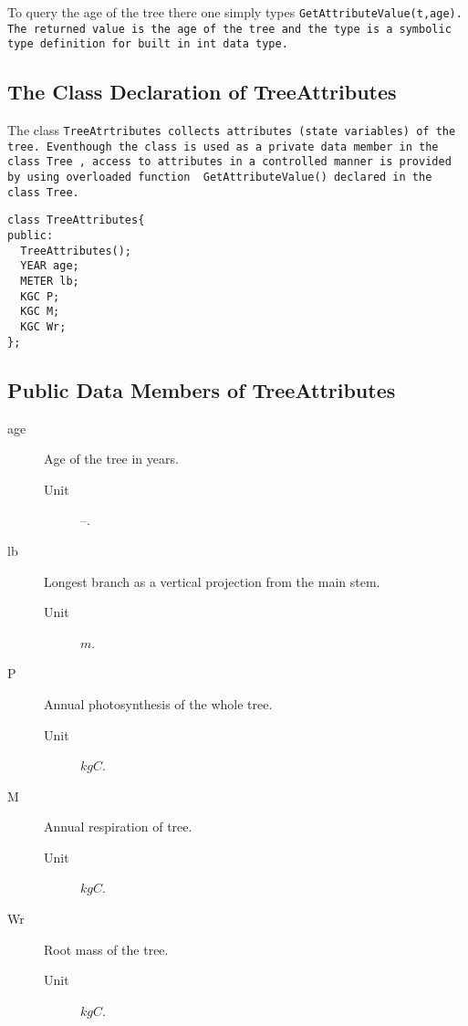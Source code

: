 To query the age of the tree there one simply types
\tt GetAttributeValue(t,age)\rm. The returned value is the 
age of the tree and the type is a symbolic type definition for 
built in int data type.

\subsection{The Class Declaration of TreeAttributes}

The class \tt TreeAtrtributes \rm collects attributes (state
variables) of the tree. Eventhough the class is used as a private data
member in the class \tt Tree \rm, access to attributes in a controlled
manner is provided by using overloaded function \tt
GetAttributeValue() \rm declared in the class \tt Tree\rm.

\begin{verbatim}
class TreeAttributes{
public:
  TreeAttributes();
  YEAR age;              
  METER lb;              
  KGC P;                 
  KGC M;                
  KGC Wr;              
};
\end{verbatim}

\subsection{Public Data Members of TreeAttributes}

\begin{description}
  \item [age] Age of the tree in years.
    \begin{description}
      \item[Unit] --.
    \end{description}
  \item [lb]  Longest branch as a vertical projection 
              from the main stem.
    \begin{description}
      \item[Unit] $m$.
    \end{description} 
  \item [P]   Annual photosynthesis of the whole tree.
    \begin{description}
      \item[Unit] $kgC$.
    \end{description} 
  \item [M] Annual respiration of tree.
    \begin{description}
      \item[Unit] $kgC$.
    \end{description}
  \item [Wr]  Root mass of the tree.
    \begin{description}
      \item[Unit] $kgC$.
    \end{description}
\end{description}

